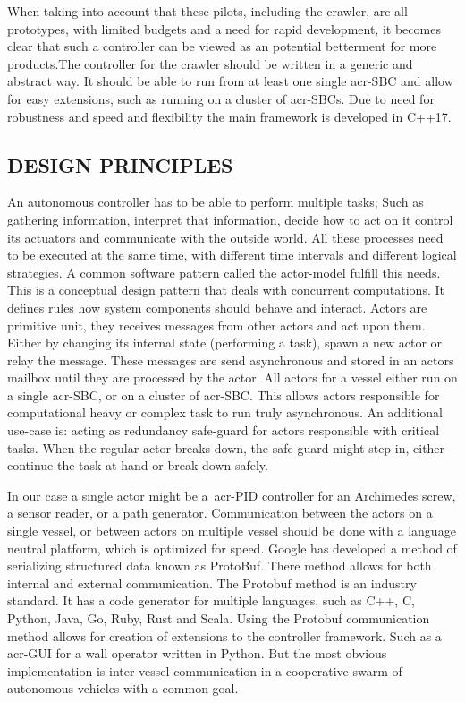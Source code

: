 When taking into account that these pilots, including the crawler, are all prototypes, with limited budgets and a 
need for rapid development, it becomes clear that such a controller can be viewed as an potential betterment for more
products.The controller for the crawler should be written in a generic and abstract way. It should be able to run 
from at least one single \gls{acr-SBC} and allow for easy extensions, such as running on a cluster of \gls{acr-SBC}s.
Due to need for robustness and speed and flexibility the main framework is developed in C++17.

\subsection{DESIGN PRINCIPLES}

An autonomous controller has to be able to perform multiple tasks; Such as gathering information, interpret that
information, decide how to act on it control its actuators and communicate with the outside world. All these processes
need to be executed at the same time, with different time intervals and different logical strategies. A common software
pattern called the actor-model fulfill this needs. This is a conceptual design pattern that deals with concurrent
computations. It defines rules how system components should behave and interact. Actors are primitive unit, they
receives messages from other actors and act upon them. Either by changing its internal state (performing a task), spawn
a new actor or relay the message. These messages are send asynchronous and stored in an actors mailbox until they are
processed by the actor. All actors for a vessel either run on a single \gls{acr-SBC}, or on a cluster of \gls{acr-SBC}.
This allows actors responsible for computational heavy or complex task to run truly asynchronous. An additional use-case
is: acting as redundancy safe-guard for actors responsible with critical tasks. When the regular actor breaks down, the
safe-guard might step in, either continue the task at hand or break-down safely.

In our case a single actor might be a~\gls{acr-PID} controller for an Archimedes screw, a sensor reader, or a
path generator. Communication between the actors on a single vessel, or between actors on multiple vessel should be done
with a language neutral platform, which is optimized for speed. Google has developed a method of serializing structured
data known as ProtoBuf. There method allows for both internal and external communication. The Protobuf method is an
industry standard. It has a code generator for multiple languages, such as C++, C, Python, Java, Go, Ruby, Rust and
Scala. Using the Protobuf communication method allows for creation of extensions to the controller framework. Such as a
\gls{acr-GUI} for a wall operator written in Python. But the most obvious implementation is inter-vessel
communication in a cooperative swarm of autonomous vehicles with a common goal.

